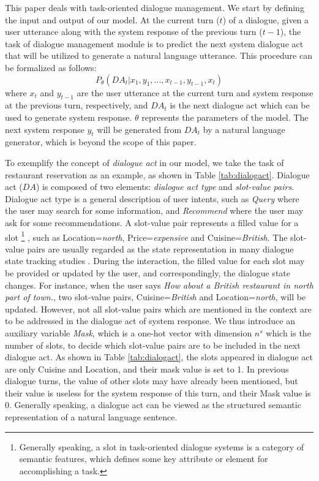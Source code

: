 This paper deals with task-oriented dialogue management. We start by defining the input and output of our model. At the current turn ($t$) of a dialogue, given a user utterance along with the system response of the previous turn ($t-1$), the task of dialogue management module is to predict the next system dialogue act that will be utilized to generate a natural language utterance. This procedure can be formalized as follows:
\begin{equation*}
    P_{\theta}({DA}_t|x_1, y_1,..., x_{t-1}, y_{t-1}, x_{t})
\end{equation*}
where $x_t$ and $y_{t-1}$ are the user utterance at the current turn and system response at the previous turn, respectively, and ${DA}_t$ is the next dialogue act which can be used to generate system response. $\theta$ represents the parameters of the model. The next system response $y_t$ will be generated from $DA_t$ by a natural language generator, which is beyond the scope of this paper.

To exemplify the concept of {\it dialogue act} in our model, we take the task of restaurant reservation as an example, as shown in Table \ref{tab:dialogact}. Dialogue act ($DA$) is composed of two elements: {\em dialogue act type} and {\em slot-value pairs}. Dialogue act type is a general description of user intents, such as {\em Query} where the user may search for some information, and {\em Recommend} where the user may ask for some recommendations. A slot-value pair represents a filled value for a slot
\footnote{Generally speaking, a slot in task-oriented dialogue systems is a category of semantic features, which defines some key attribute or element for accomplishing a task. } %
, such as Location={\em north}, Price={\em expensive} and Cuisine={\em British}. The slot-value pairs are usually regarded as the state representation in many dialogue state tracking studies \cite{henderson2014word}. During the interaction, the filled value for each slot may be provided or updated by the user, and correspondingly, the dialogue state changes. For instance, when the user says {\em How about a British restaurant in north part of town.}, two slot-value pairs, Cuisine={\em British} and Location={\em north}, will be updated. 
However, not all slot-value pairs which are mentioned in the context are to be addressed in the dialogue act of system response. We thus introduce an auxiliary variable {\em Mask}, which is a one-hot vector with dimension $n^s$ which is the number of slots, to decide which slot-value pairs are to be included in the next dialogue act. 
As shown in Table \ref{tab:dialogact}, the slots appeared in dialogue act are only Cuisine and Location, and their mask value is set to 1. In previous dialogue turns, the value of other slots may have already been mentioned, but their value is useless for the system response of this turn, and their Mask value is 0.
Generally speaking, a dialogue act can be viewed as the structured semantic representation of a natural language sentence.


